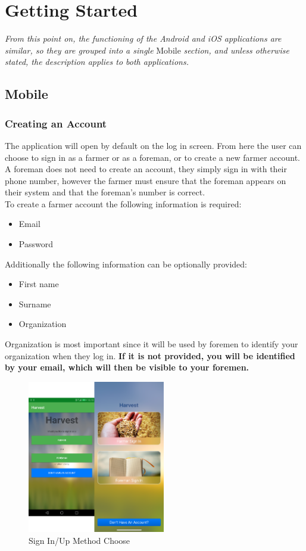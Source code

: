 \documentclass[11pt]{article}
\begin{document}
\newpage
\section{Getting Started}
\textit{From this point on, the functioning of the Android and iOS applications are similar, so they are grouped into a single} Mobile \textit{section, and unless otherwise stated, the description applies to both applications.}

\subsection{Mobile}

\subsubsection{Creating an Account}
The application will open by default on the log in screen. From here the user can choose to sign in as a farmer or as a foreman, or to create a new farmer account. A foreman does not need to create an account, they simply sign in with their phone number, however the farmer must ensure that the foreman appears on their system and that the foreman's number is correct.\\
To create a farmer account the following information is required:
\begin{itemize}
\item Email
\item Password
\end{itemize}
Additionally the following information can be optionally provided:
\begin{itemize}
\item First name
\item Surname
\item Organization
\end{itemize}
Organization is most important since it will be used by foremen to identify your organization when they log in. \textbf{If it is not provided, you will be identified by your email, which will then be visible to your foremen.}

\begin{figure}[h]
 \centering
 \includegraphics[width=6cm, keepaspectratio]{Images/mobileLoginChoose.png}
 \caption{Sign In/Up Method Choose}
 \label{SignUpMobile}
\end{figure}
\end{document}
